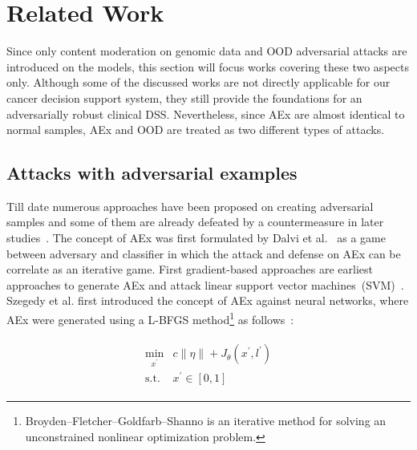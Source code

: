 
\section{Related Work} \label{chapter_6:rw}
Since only content moderation on genomic data and OOD adversarial attacks are introduced on the models, this section will focus works covering these two aspects only. Although some of the discussed works are not directly applicable for our cancer decision support system, they still provide the foundations for an  adversarially robust clinical DSS. Nevertheless, since AEx are almost identical to normal samples, AEx and OOD are treated as two different types of attacks. 

\subsection{Attacks with adversarial examples}
Till date numerous approaches have been proposed on creating adversarial samples and some of them are already defeated by a countermeasure in later studies~\cite{yuan2019adversarial}. The concept of AEx was first formulated by Dalvi et al.~\cite{dalvi2004adversarial} as a game between adversary and classifier in which the attack and defense on AEx can be correlate as an iterative game. First gradient-based approaches are earliest approaches to generate AEx and attack linear support vector machines~(SVM)~\cite{biggio2013evasion}. Szegedy et al.\cite{szegedy2013intriguing} first introduced the concept of AEx against neural networks, where AEx were generated using a L-BFGS method\footnote{ Broyden–Fletcher–Goldfarb–Shanno is an iterative method for solving an unconstrained nonlinear optimization problem.} as follows~\cite{yuan2019adversarial}:

\vspace{-6mm}
\begin{align}
    \begin{array}{cl}
        \min _{x^{\prime}} & c\|\eta\|+J_{\theta}\left(x^{\prime}, l^{\prime}\right) \\
         \text {s.t.} & x^{\prime} \in[0,1]
    \end{array}
    \label{eq:fgsm_aex}
\end{align}

